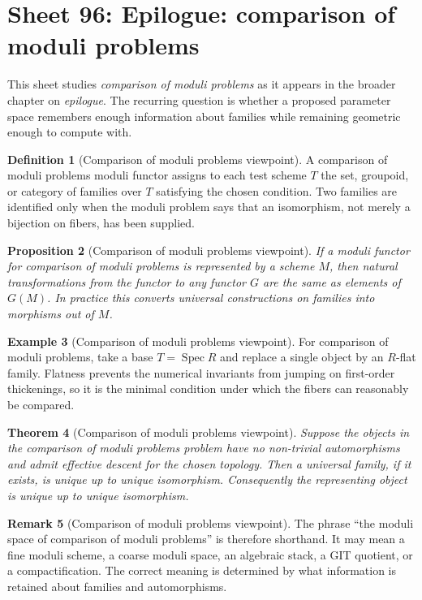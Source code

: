 \documentclass[11pt]{amsart}
\newtheorem{theorem}{Theorem}[section]
\newtheorem{proposition}[theorem]{Proposition}
\theoremstyle{definition}
\newtheorem{definition}[theorem]{Definition}
\newtheorem{example}[theorem]{Example}
\newtheorem{remark}[theorem]{Remark}
\newcommand{\Spec}{\operatorname{Spec}}
\begin{document}
\section{Sheet 96: Epilogue: comparison of moduli problems}
This sheet studies \emph{comparison of moduli problems} as it appears in the broader chapter on \emph{epilogue}.  The recurring question is whether a proposed parameter space remembers enough information about families while remaining geometric enough to compute with.
\begin{definition}[Comparison of moduli problems viewpoint]
A comparison of moduli problems moduli functor assigns to each test scheme $T$ the set, groupoid, or category of families over $T$ satisfying the chosen condition.  Two families are identified only when the moduli problem says that an isomorphism, not merely a bijection on fibers, has been supplied.
\end{definition}
\begin{proposition}[Comparison of moduli problems viewpoint]
If a moduli functor for comparison of moduli problems is represented by a scheme $M$, then natural transformations from the functor to any functor $G$ are the same as elements of $G(M)$.  In practice this converts universal constructions on families into morphisms out of $M$.
\end{proposition}
\begin{example}[Comparison of moduli problems viewpoint]
For comparison of moduli problems, take a base $T=\Spec R$ and replace a single object by an $R$-flat family.  Flatness prevents the numerical invariants from jumping on first-order thickenings, so it is the minimal condition under which the fibers can reasonably be compared.
\end{example}
\begin{theorem}[Comparison of moduli problems viewpoint]
Suppose the objects in the comparison of moduli problems problem have no non-trivial automorphisms and admit effective descent for the chosen topology.  Then a universal family, if it exists, is unique up to unique isomorphism.  Consequently the representing object is unique up to unique isomorphism.
\end{theorem}
\begin{remark}[Comparison of moduli problems viewpoint]
The phrase ``the moduli space of comparison of moduli problems'' is therefore shorthand.  It may mean a fine moduli scheme, a coarse moduli space, an algebraic stack, a GIT quotient, or a compactification.  The correct meaning is determined by what information is retained about families and automorphisms.
\end{remark}
\end{document}
